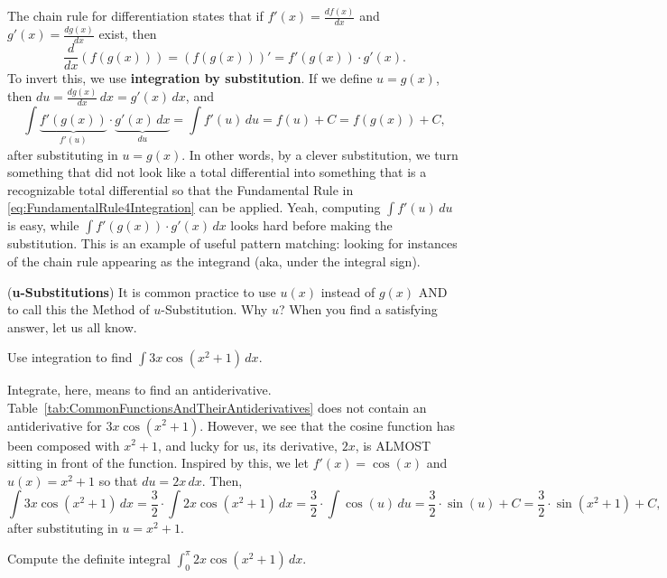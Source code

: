 The chain rule for differentiation states that if \( f'(x) = \frac{df(x)}{dx} \) and  \( g'(x) = \frac{dg(x)}{dx} \) exist, then 
$$ \frac{d}{dx} \left(f(g(x)) \right)= \left( f(g(x))\right)' = f'(g(x)) \cdot g'(x).$$
To invert this, we use \textbf{integration by substitution}. If we define $u=g(x)$, then $du = \frac{dg(x)}{dx}\, dx = g'(x)\, dx $, and 
\begin{equation}
    \int \underbrace{f'(g(x))}_{f'(u)} \cdot \underbrace{g'(x) \, dx}_{du} = \int f'(u)\, du = f(u) + C =  f(g(x)) + C, 
\end{equation}
after substituting in $u=g(x)$. In other words, by a clever substitution, we turn something that did not look like a total differential into something that is a recognizable total differential so that the Fundamental Rule in \eqref{eq:FundamentalRule4Integration} can be applied. Yeah, computing $\int f'(u)\, du$ is easy, while $\int f'(g(x)) \cdot g'(x) \, dx$ looks hard before making the substitution. This is an example of useful pattern matching: looking for instances of the chain rule appearing as the integrand (aka, under the integral sign).


\bigskip 
\begin{rem} (\textbf{u-Substitutions}) 
    It is common practice to use $u(x)$ instead of $g(x)$ AND to call this the Method of $u$-Substitution. Why $u$? When you find a satisfying answer, let us all know.
\end{rem}

\bigskip

\begin{example} 
\label{ex:uSubstiutionExamp01}
Use integration to find \( \int 3x \cos(x^2 + 1) \, dx \).
\end{example}

\solution  Integrate, here, means to find an antiderivative. Table~\ref{tab:CommonFunctionsAndTheirAntiderivatives} does not contain an antiderivative for $3x \cos(x^2 + 1)$. However, we see that the cosine function has been composed with $x^2 + 1$, and lucky for us, its derivative, $2x$, is ALMOST sitting in front of the function. Inspired by this, we let $f'(x) = \cos(x)$ and \( u(x) = x^2 + 1 \) so that \( du = 2x \, dx \). Then,
\[ \int 3x \cos(x^2 + 1) \, dx = \frac{3}{2} \cdot  \int 2x \cos(x^2 + 1) \, dx =\frac{3}{2} \cdot\int \cos(u) \, du = \frac{3}{2} \cdot\sin(u) + C = \frac{3}{2} \cdot \sin(x^2 + 1) + C, \]
after substituting in $u = x^2 + 1$.
\Qed

\bigskip

\begin{example} 
\label{ex:uSubstiutionExamp02}
Compute the definite integral \( \int_0^\pi 2x \cos(x^2 + 1) \, dx \). 
\end{example}

